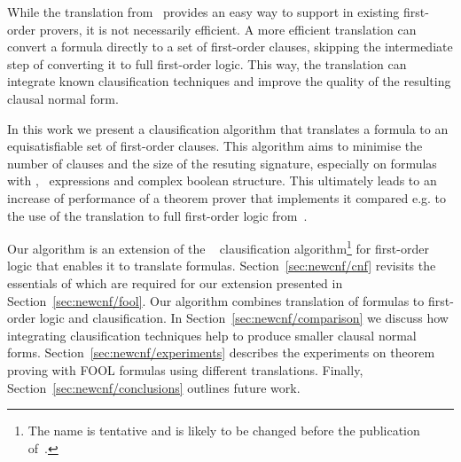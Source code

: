While the translation from~\cite{FOOL} provides an easy way to support \folb{} in existing first-order provers, it is not necessarily efficient. A more efficient translation can convert a \folb{} formula directly to a set of first-order clauses, skipping the intermediate step of converting it to full first-order logic. This way, the translation can integrate known clausification techniques and improve the quality of the resulting clausal normal form. %



In this work we present a clausification algorithm that translates a \folb{} formula to an equisatisfiable set of first-order clauses. This algorithm aims to minimise the number of clauses and the size of the resuting signature, especially on formulas with \ITE, \LETIN\ expressions and complex boolean structure. This ultimately leads to an increase of performance of a theorem prover that implements it compared e.g. to the use of the translation to full first-order logic from~\cite{FOOL}.

Our algorithm is an extension of the \newcnf~\cite{newcnf_fol} clausification algorithm\footnote{The name \newcnf{} is tentative and is likely to be changed before the publication of~\cite{newcnf_fol}.} for first-order logic that enables it to translate \folb{} formulas. Section~\ref{sec:newcnf/cnf} revisits the essentials of \newcnf{} which are required for our extension presented in Section~\ref{sec:newcnf/fool}. Our algorithm combines translation of \folb{} formulas to first-order logic and clausification. In Section~\ref{sec:newcnf/comparison} we discuss how integrating clausification techniques help to produce smaller clausal normal forms. Section~\ref{sec:newcnf/experiments} describes the experiments on theorem proving with FOOL formulas using different translations. Finally, Section~\ref{sec:newcnf/conclusions} outlines future work.

